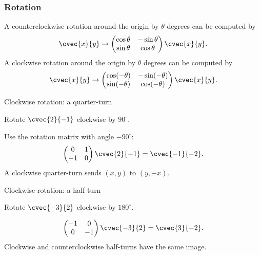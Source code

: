 \begin{frame}
\frametitle{Rotation}
A counterclockwise rotation around the origin by $\theta$ degrees can be computed by
\[ \cvec{x}{y} \to \begin{pmatrix} \cos\theta & -\sin\theta \\ \sin\theta & \cos\theta \end{pmatrix} \cvec{x}{y}.\]
A clockwise rotation around the origin by $\theta$ degrees can be computed by
\[ \cvec{x}{y} \to \begin{pmatrix} \cos(-\theta) & -\sin(-\theta) \\ \sin(-\theta) & \cos(-\theta) \end{pmatrix} \cvec{x}{y}.\]
\end{frame}
\begin{frame}[t]{Clockwise rotation: a quarter-turn}
\small
\begin{ex}
Rotate $\cvec{2}{-1}$ clockwise by $90^\circ$.
\end{ex}
\begin{sol}
Use the rotation matrix with angle $-90^\circ$:\[\begin{pmatrix}0&1\\-1&0\end{pmatrix}\cvec{2}{-1}=\cvec{-1}{-2}.\] A clockwise quarter-turn sends $(x,y)$ to $(y,-x)$.
\end{sol}
\end{frame}

\begin{frame}[t]{Clockwise rotation: a half-turn}
\small
\begin{ex}
Rotate $\cvec{-3}{2}$ clockwise by $180^\circ$.
\end{ex}
\begin{sol}
\[\begin{pmatrix}-1&0\\0&-1\end{pmatrix}\cvec{-3}{2}=\cvec{3}{-2}.\] Clockwise and counterclockwise half-turns have the same image.
\end{sol}
\end{frame}


